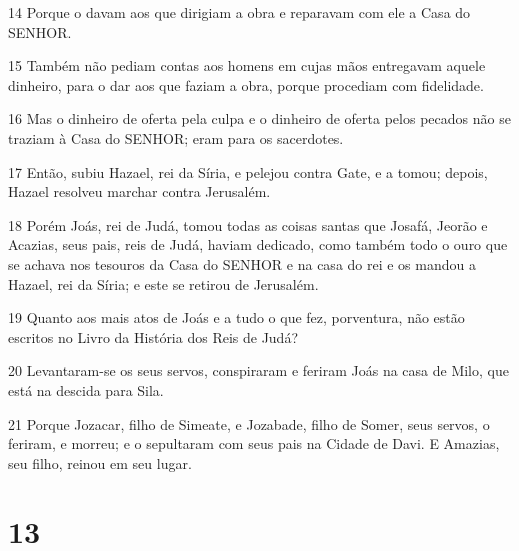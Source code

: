 \par 14 Porque o davam aos que dirigiam a obra e reparavam com ele a Casa do SENHOR.
\par 15 Também não pediam contas aos homens em cujas mãos entregavam aquele dinheiro, para o dar aos que faziam a obra, porque procediam com fidelidade.
\par 16 Mas o dinheiro de oferta pela culpa e o dinheiro de oferta pelos pecados não se traziam à Casa do SENHOR; eram para os sacerdotes.
\par 17 Então, subiu Hazael, rei da Síria, e pelejou contra Gate, e a tomou; depois, Hazael resolveu marchar contra Jerusalém.
\par 18 Porém Joás, rei de Judá, tomou todas as coisas santas que Josafá, Jeorão e Acazias, seus pais, reis de Judá, haviam dedicado, como também todo o ouro que se achava nos tesouros da Casa do SENHOR e na casa do rei e os mandou a Hazael, rei da Síria; e este se retirou de Jerusalém.
\par 19 Quanto aos mais atos de Joás e a tudo o que fez, porventura, não estão escritos no Livro da História dos Reis de Judá?
\par 20 Levantaram-se os seus servos, conspiraram e feriram Joás na casa de Milo, que está na descida para Sila.
\par 21 Porque Jozacar, filho de Simeate, e Jozabade, filho de Somer, seus servos, o feriram, e morreu; e o sepultaram com seus pais na Cidade de Davi. E Amazias, seu filho, reinou em seu lugar.

\chapter{13}

